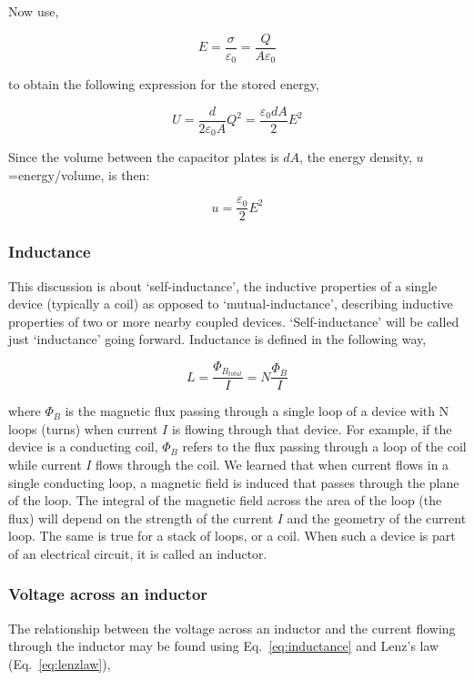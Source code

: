 \documentclass[12pt]{article}
\begin{document}
\begin{flushleft}
Now use,

\[
E=\frac{\sigma}{\varepsilon_{0}} = \frac{Q}{A\varepsilon_{0}}
\]

to obtain the following expression for the stored energy,

\[
U = \frac{d}{2\varepsilon_{0}A}Q^{2} =  \frac{\varepsilon_{0}dA}{2} E^{2} 
\]

Since the volume between the capacitor plates is $dA$, the energy density, $u$=energy/volume, is then:

\[
u =  \frac{\varepsilon_{0}}{2} E^{2} 
\]


\subsubsection*{\bf Inductance}

This discussion is about `self-inductance', the inductive properties of a single device (typically a coil) as opposed to `mutual-inductance', describing inductive properties of two or more nearby coupled devices.  `Self-inductance' will be called just `inductance' going forward.  Inductance is defined in the following way,

\begin{equation}
L=\frac{\Phi_{B_{total}}}{I} = N\frac{\Phi_{B}}{I}
\label{eq:inductance}
\end{equation}

where $\Phi_{B}$ is the magnetic flux passing through a single loop of a device with N loops (turns) when current $I$ is flowing through that device.  For example, if the device is a conducting coil, $\Phi_{B}$ refers to the flux passing through a loop of the coil while current $I$ flows through the coil.  We learned that when current flows in a single conducting loop, a magnetic field is induced that passes through the plane of the loop.  The integral of the magnetic field across the area of the loop (the flux) will depend on the strength of the current $I$ and the geometry of the current loop.  The same is true for a stack of loops, or a coil.  When such a device is part of an electrical circuit, it is called an inductor.  

\subsubsection*{\bf Voltage across an inductor}

The relationship between the voltage across an inductor and the current flowing through the inductor may be found using Eq.~\ref{eq:inductance} and Lenz's law (Eq.~\ref{eq:lenzlaw}),


\end{flushleft}
\end{document}
